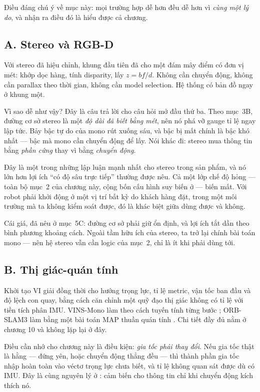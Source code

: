 \documentclass[../../vslam.tex]{subfiles}
\begin{document}
Điều đáng chú ý về mục này: mọi trường hợp dễ hơn đều dễ hơn vì \emph{cùng một lý do}, và nhận ra điều đó là hiểu được cả chương.

\subsection{A. Stereo và RGB-D}

Với stereo đã hiệu chỉnh, khung đầu tiên đã cho một đám mây điểm có đơn vị mét: khớp dọc hàng, tính disparity, lấy \(z = bf/d\). Không cần chuyển động, không cần parallax theo thời gian, không cần model selection. Hệ thống có bản đồ ngay ở khung một.

Vì sao dễ như vậy? Đây là câu trả lời cho câu hỏi mở đầu thứ ba. Theo  mục~3B, đường cơ sở stereo là một \emph{độ dài đã biết bằng mét}, nên nó phá vỡ gauge tỉ lệ ngay lập tức. Bảy bậc tự do của mono rút xuống sáu, và bậc bị mất chính là bậc khó nhất --- bậc mà mono cần chuyển động để lấy. Nói khác đi: stereo mua thông tin bằng \emph{phần cứng} thay vì bằng \emph{chuyển động}.

Đây là một trong những lập luận mạnh nhất cho stereo trong sản phẩm, và nó lớn hơn lợi ích ``có độ sâu trực tiếp'' thường được nêu. Cả một lớp chế độ hỏng --- toàn bộ mục~2 của chương này, cộng bốn cấu hình suy biến ở  --- biến mất. Với robot phải khởi động ở một vị trí bất kỳ do khách hàng đặt, trong một môi trường mà ta không kiểm soát được, đó là khác biệt giữa dùng được và không.

Cái giá, đã nêu ở  mục~5C: đường cơ sở phải giữ ổn định, và lợi ích tắt dần theo bình phương khoảng cách. Ngoài tầm hữu ích của stereo, ta trở lại chính bài toán mono --- nên hệ stereo vẫn cần logic của mục~2, chỉ là ít khi phải dùng tới.

\subsection{B. Thị giác-quán tính}

Khởi tạo VI giải đồng thời cho hướng trọng lực, tỉ lệ metric, vận tốc ban đầu và độ lệch con quay, bằng cách căn chỉnh một quỹ đạo thị giác không có tỉ lệ với tiền tích phân IMU. VINS-Mono làm theo cách tuyến tính từng bước \cite{qin2018vinsmono}; ORB-SLAM3 làm bằng một bài toán MAP thuần quán tính \cite{campos2021orbslam3}. Chi tiết đầy đủ nằm ở  chương 10 và không lặp lại ở đây.

Điều cần nhớ cho chương này là điều kiện: \emph{gia tốc phải thay đổi}. Nếu gia tốc thật là hằng --- đứng yên, hoặc chuyển động thẳng đều --- thì thành phần gia tốc nhập hoàn toàn vào véctơ trọng lực chưa biết, và tỉ lệ không quan sát được dù có IMU. Đây là cùng nguyên lý ở : cảm biến cho thông tin chỉ khi chuyển động kích thích nó.
\end{document}
